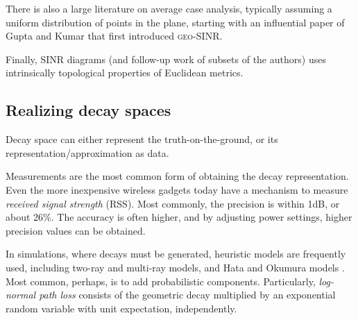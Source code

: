 \documentclass[11pt]{amsart}
\newcommand{\geomodel}{\textsc{geo-SINR}}
\begin{document}
There is also a large literature on average case analysis, typically
assuming a uniform distribution of points in the plane, starting with
an influential paper of Gupta and Kumar \cite{kumar00} that first
introduced {\geomodel}.

Finally, SINR diagrams \cite{AvinEKLPR12} (and follow-up work of
subsets of the authors) uses intrinsically topological properties of Euclidean
metrics. 


\iffalse The algorithms/analysis must be adaptable to different values than
hold only in the plane, e.g., the path loss term $\alpha$.
We know of no result to date for which this cannot be 
attained. 

\textbf{Issues in doing this formally:}
\begin{itemize}
  \item Allowed: Distances and triangular inequality
  \item Disallowed: positions, angles, packings. (see Fading section)
  \item May need: assume symmetry; knowledge of parameter upper bounds
  \item Parameters must adapt to the fading space: $\alpha$ -->
    $\zeta$, with inequality rather than equality.
  \item Algorithms modified to use decay (instead of distances), 
    but can do so indirectly through the distance function $d$. Thus, no change.
  \item Idea: In the end, the essential matters is whether a
    transmission is successful or not. This can be computed equally
    well depending on decays.
\end{itemize}
\fi

\iffalse \subsection{Realizing decay spaces}
\label{sec:realizing}

Decay space can either represent the truth-on-the-ground, or
its representation/approximation as data.


Measurements are the most common form of obtaining the decay representation.
Even the more inexpensive wireless gadgets today have a mechanism
to measure \emph{received signal strength} (RSS). Most commonly, the
precision is within 1dB, or about 26\%.
The accuracy is often higher, and by adjusting power settings,
higher precision values can be obtained.

In simulations, where decays must be generated, 
heuristic models are frequently used,
including two-ray and multi-ray models,
and Hata and Okumura models \cite{Goldsmith}.
Most common, perhaps, is to add probabilistic components.
Particularly, \emph{log-normal path loss} consists of 
the geometric decay multiplied by an exponential random variable with unit expectation, independently. 
\end{document}
